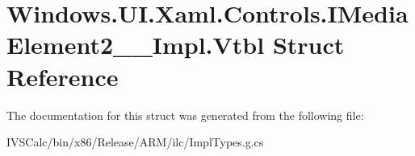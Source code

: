 \hypertarget{struct_windows_1_1_u_i_1_1_xaml_1_1_controls_1_1_i_media_element2_____impl_1_1_vtbl}{}\section{Windows.\+U\+I.\+Xaml.\+Controls.\+I\+Media\+Element2\+\_\+\+\_\+\+Impl.\+Vtbl Struct Reference}
\label{struct_windows_1_1_u_i_1_1_xaml_1_1_controls_1_1_i_media_element2_____impl_1_1_vtbl}


The documentation for this struct was generated from the following file\+:\begin{DoxyCompactItemize}
\item 
I\+V\+S\+Calc/bin/x86/\+Release/\+A\+R\+M/ilc/Impl\+Types.\+g.\+cs\end{DoxyCompactItemize}
